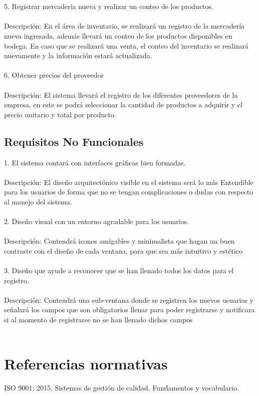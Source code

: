 \documentclass[12pt,a4paper]{article}
\begin{document}
\\\\
5.	Registrar mercadería nueva y realizar un conteo de los productos.\\\\
Descripción: En el área de inventario, se  realizará un registro de la mercadería nueva ingresada, además llevará un conteo de los productos disponibles en bodega.
En caso que se realizará una venta, el conteo del inventario se realizará nuevamente y la información estará actualizada.
\\\\
6. Obtener  precios  del proveedor\\\\
Descripción: El sistema llevará el registro de los diferentes proveedores de la empresa, en este se podrá seleccionar la cantidad de productos a adquirir  y el precio unitario y total por producto.

\subsection{Requisitos No Funcionales}

1.	El sistema contará con interfaces gráficas bien formadas.\\\\
Descripción: El diseño arquitectónico visible en el sistema será lo más Entendible para los usuarios de forma que  no se tengan complicaciones o dudas con respecto al manejo del sistema.
\\\\
2.	Diseño visual con  un entorno agradable para los usuarios.\\\\
Descripción: Contendrá iconos amigables y minimalista que hagan un buen contraste con el diseño de cada  ventana, para que sea más intuitivo y estético
\\\\
3.	Diseño que ayude a reconocer que se han llenado todos los datos para el registro.\\\\
Descripción: Contendrá una sub-ventana donde se registren los nuevos usuarios y señalará los campos que son obligatorios llenar para poder registrarse y notificara si al momento de registrarse no se han llenado dichos campos
\\\\


\section{Referencias normativas}\textbf{}
ISO 9001: 2015, Sistemas de gestión de calidad. Fundamentos y vocabulario.
\end{document}
